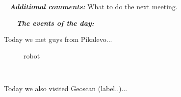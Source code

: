    \newline
  \textit{\textbf{Additional comments:}} What to do the next meeting.
  
    \newline
   \textit{\textbf{The events of the day:}}
   \begin{enumerate*}
  	 \item Today we met guys from Pikalevo...
  	 \begin{figure}[H]
  	 	\begin{minipage}[h]{1\linewidth}
  	 		\caption{robot}
  	 	\end{minipage}
  	 \end{figure}
   	
   	 \item Today we also visited Geoscan (label..)...
   \end{enumerate*}

\fillpage
